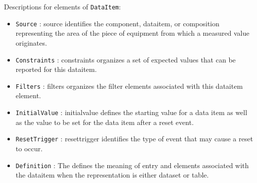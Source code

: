 Descriptions for elements of \texttt{DataItem}:

\begin{itemize}
\item \texttt{Source} : \gls{source} identifies the \gls{component}, \gls{dataitem}, or \gls{composition} representing the area of the piece of equipment from which a measured value originates.
\item \texttt{Constraints} : \gls{constraints} \glspl{organize} a set of expected values that can be reported for this \gls{dataitem}.
\item \texttt{Filters} : \gls{filters} \glspl{organize} the \gls{filter} elements associated with this \gls{dataitem} element. 
\item \texttt{InitialValue} : \gls{initialvalue} defines the starting value for a data item as well as the value to be set for the data item after a reset event.
\item \texttt{ResetTrigger} : \gls{resettrigger} identifies the type of event that may cause a reset to occur.
\item \texttt{Definition} : The  defines the meaning of \gls{entry} and  elements associated with the \gls{dataitem} when the \gls{representation} is either \gls{dataset} or \gls{table}.
\end{itemize}
\FloatBarrier
